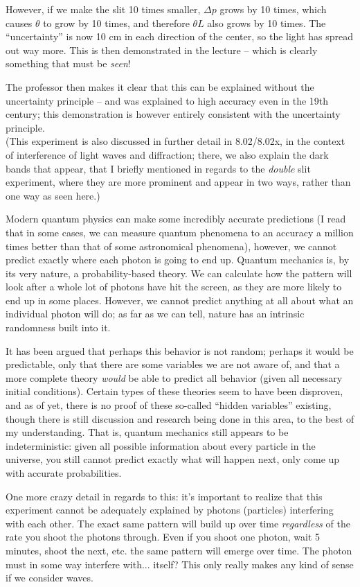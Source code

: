 However, if we make the slit 10 times smaller, $\Delta p$ grows by 10 times, which causes $\theta$ to grow by 10 times, and therefore $\theta L$ also grows by 10 times. The ``uncertainty'' is now 10 cm in each direction of the center, so the light has spread out way more. This is then demonstrated in the lecture -- which is clearly something that must be \emph{seen}!

The professor then makes it clear that this can be explained without the uncertainty principle -- and was explained to high accuracy even in the 19th century; this demonstration is however entirely consistent with the uncertainty principle.\\
(This experiment is also discussed in further detail in 8.02/8.02x, in the context of interference of light waves and diffraction; there, we also explain the dark bands that appear, that I briefly mentioned in regards to the \emph{double} slit experiment, where they are more prominent and appear in two ways, rather than one way as seen here.)

Modern quantum physics can make some incredibly accurate predictions (I read that in some cases, we can measure quantum phenomena to an accuracy a million times better than that of some astronomical phenomena), however, we cannot predict exactly where each photon is going to end up. Quantum mechanics is, by its very nature, a probability-based theory. We can calculate how the pattern will look after a whole lot of photons have hit the screen, as they are more likely to end up in some places. However, we cannot predict anything at all about what an individual photon will do; as far as we can tell, nature has an intrinsic randomness built into it.

It has been argued that perhaps this behavior is not random; perhaps it would be predictable, only that there are some variables we are not aware of, and that a more complete theory \emph{would} be able to predict all behavior (given all necessary initial conditions). Certain types of these theories seem to have been disproven, and as of yet, there is no proof of these so-called ``hidden variables'' existing, though there is still discussion and research being done in this area, to the best of my understanding. That is, quantum mechanics still appears to be indeterministic: given all possible information about every particle in the universe, you still cannot predict exactly what will happen next, only come up with accurate probabilities.

One more crazy detail in regards to this: it's important to realize that this experiment cannot be adequately explained by photons (particles) interfering with each other. The exact same pattern will build up over time \emph{regardless} of the rate you shoot the photons through. Even if you shoot one photon, wait 5 minutes, shoot the next, etc. the same pattern will emerge over time. The photon must in some way interfere with... itself? This only really makes any kind of sense if we consider waves.


